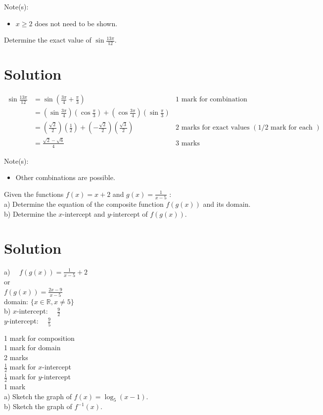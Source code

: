 \documentclass[10pt]{article}
\begin{document}
Note(s):

\begin{itemize}
  \item $x \geq 2$ does not need to be shown.
\end{itemize}

Determine the exact value of $\sin \frac{13 \pi}{12}$.

\section*{Solution}
$$
\begin{array}{rlr}
\sin \frac{13 \pi}{12} & =\sin \left(\frac{3 \pi}{4}+\frac{\pi}{3}\right) & 1 \text { mark for combination } \\
& =\left(\sin \frac{3 \pi}{4}\right)\left(\cos \frac{\pi}{3}\right)+\left(\cos \frac{3 \pi}{4}\right)\left(\sin \frac{\pi}{3}\right) & \\
& =\left(\frac{\sqrt{2}}{2}\right)\left(\frac{1}{2}\right)+\left(-\frac{\sqrt{2}}{2}\right)\left(\frac{\sqrt{3}}{2}\right) & 2 \text { marks for exact values }(1 / 2 \text { mark for each }) \\
& =\frac{\sqrt{2}-\sqrt{6}}{4} & 3 \text { marks }
\end{array}
$$

Note(s):

\begin{itemize}
  \item Other combinations are possible.
\end{itemize}

Given the functions $f(x)=x+2$ and $g(x)=\frac{1}{x-5}$ :\\
a) Determine the equation of the composite function $f(g(x))$ and its domain.\\
b) Determine the $x$-intercept and $y$-intercept of $f(g(x))$.

\section*{Solution}
a) $\quad f(g(x))=\frac{1}{x-5}+2$\\
or\\
$f(g(x))=\frac{2 x-9}{x-5}$\\
domain: $\{x \in \mathbb{R}, x \neq 5\}$\\
b) $x$-intercept: $\quad \frac{9}{2}$\\
$y$-intercept: $\quad \frac{9}{5}$

1 mark for composition\\
1 mark for domain\\
2 marks\\
$\frac{1}{2}$ mark for $x$-intercept\\
$\frac{1}{2}$ mark for $y$-intercept\\
1 mark\\
a) Sketch the graph of $f(x)=\log _{5}(x-1)$.\\
b) Sketch the graph of $f^{-1}(x)$.
\end{document}
